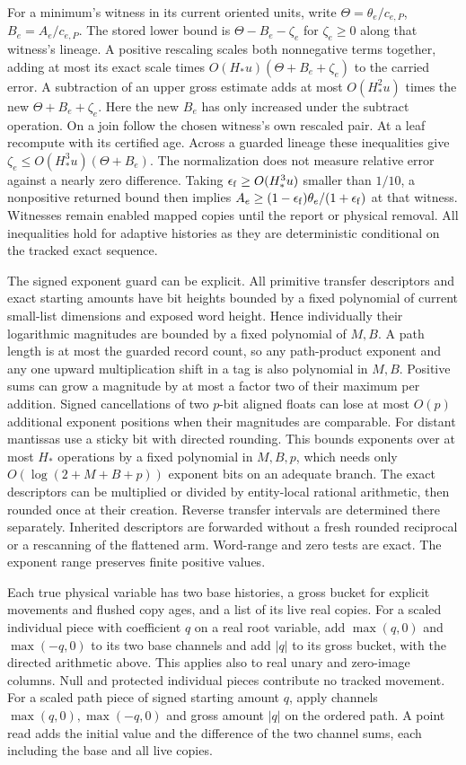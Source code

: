 \documentclass[11pt]{article}
\begin{document}
For a minimum's witness in its current oriented units, write \(\Theta=\theta_e/c_{e,P}\), \(B_e=A_e/c_{e,P}\). The stored lower bound is \(\Theta-B_e-\zeta_e\) for \(\zeta_e\ge0\) along that witness's lineage. A positive rescaling scales both nonnegative terms together, adding at most its exact scale times \(O(H_\ast u)(\Theta+B_e+\zeta_e)\) to the carried error. A subtraction of an upper gross estimate adds at most \(O(H_\ast^2u)\) times the new \(\Theta+B_e+\zeta_e\). Here the new \(B_e\) has only increased under the subtract operation. On a join follow the chosen witness's own rescaled pair. At a leaf recompute with its certified age. Across a guarded lineage these inequalities give \(\zeta_e\le O(H_\ast^3u)(\Theta+B_e)\). The normalization does not measure relative error against a nearly zero difference. Taking \(\epsilon_{\rm f}\ge O(H_\ast^3u)\) smaller than \(1/10\), a nonpositive returned bound then implies \(A_e\ge(1-\epsilon_{\rm f})\theta_e/(1+\epsilon_{\rm f})\) at that witness. Witnesses remain enabled mapped copies until the report or physical removal. All inequalities hold for adaptive histories as they are deterministic conditional on the tracked exact sequence.

The signed exponent guard can be explicit. All primitive transfer descriptors and exact starting amounts have bit heights bounded by a fixed polynomial of current small-list dimensions and exposed word height. Hence individually their logarithmic magnitudes are bounded by a fixed polynomial of \(M,B\). A path length is at most the guarded record count, so any path-product exponent and any one upward multiplication shift in a tag is also polynomial in \(M,B\). Positive sums can grow a magnitude by at most a factor two of their maximum per addition. Signed cancellations of two \(p\)-bit aligned floats can lose at most \(O(p)\) additional exponent positions when their magnitudes are comparable. For distant mantissas use a sticky bit with directed rounding. This bounds exponents over at most \(H_\ast\) operations by a fixed polynomial in \(M,B,p\), which needs only \(O(\log(2+M+B+p))\) exponent bits on an adequate branch. The exact descriptors can be multiplied or divided by entity-local rational arithmetic, then rounded once at their creation. Reverse transfer intervals are determined there separately. Inherited descriptors are forwarded without a fresh rounded reciprocal or a rescanning of the flattened arm. Word-range and zero tests are exact. The exponent range preserves finite positive values.

Each true physical variable has two base histories, a gross bucket for explicit movements and flushed copy ages, and a list of its live real copies. For a scaled individual piece with coefficient \(q\) on a real root variable, add \(\max(q,0)\) and \(\max(-q,0)\) to its two base channels and add \(|q|\) to its gross bucket, with the directed arithmetic above. This applies also to real unary and zero-image columns. Null and protected individual pieces contribute no tracked movement. For a scaled path piece of signed starting amount \(q\), apply channels \(\max(q,0),\max(-q,0)\) and gross amount \(|q|\) on the ordered path. A point read adds the initial value and the difference of the two channel sums, each including the base and all live copies.
\end{document}
